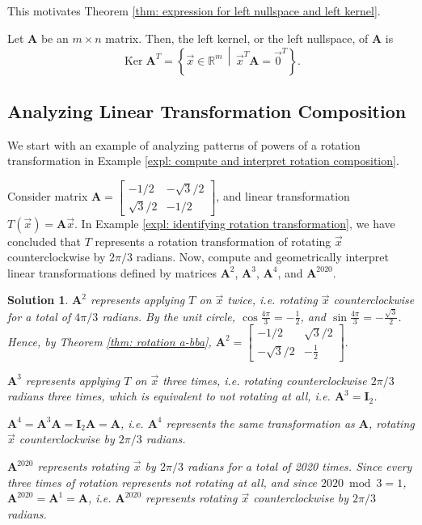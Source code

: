 \documentclass[]{book}
\DeclareMathOperator{\kernel}{Ker}
\newcommand{\suchthat}{\,\middle|\,}
\newcommand{\mat}[1]{\ensuremath{\mathbf{#1}}}
\newcommand{\idmat}[1][n]{\ensuremath{\mat{I}_#1}}
\newcommand{\R}{\ensuremath{\mathbb{R}}}
\newtheorem*{solution}{Solution}
\begin{document}
This motivates Theorem \ref{thm: expression for left nullspace and left kernel}.

\begin{theorem}
    \label{thm: expression for left nullspace and left kernel}
    Let $\mat{A}$ be an $m \times n$ matrix. Then, the left kernel, or the left nullspace, of $\mat{A}$ is
    \[\kernel\mat{A}^T = \left\{\vec{x} \in \R^m \suchthat \vec{x}^T\mat{A} = \vec{0}^T\right\}.\]
\end{theorem}

\subsection{Analyzing Linear Transformation Composition}
We start with an example of analyzing patterns of powers of a rotation transformation in Example \ref{expl: compute and interpret rotation composition}.
\begin{example}
\label{expl: compute and interpret rotation composition}
    Consider matrix $\mat{A} = \begin{bmatrix}-1/2 & -\sqrt{3}/2 \\ \sqrt{3}/2 & -1/2 \end{bmatrix}$, and linear transformation $T(\vec{x}) = \mat{A}\vec{x}$. In Example \ref{expl: identifying rotation transformation}, we have concluded that $T$ represents a rotation transformation of rotating $\vec{x}$ counterclockwise by $2\pi / 3$ radians. Now, compute and geometrically interpret linear transformations defined by matrices $\mat{A}^2$, $\mat{A}^3$, $\mat{A}^4$, and $\mat{A}^{2020}$.
\begin{solution}
    $\mat{A}^2$ represents applying $T$ on $\vec{x}$ twice, i.e. rotating $\vec{x}$ counterclockwise for a total of $4\pi / 3$ radians. By the unit circle, $\cos\frac{4\pi}{3} = -\frac{1}{2}$, and $\sin\frac{4\pi}{3} = -\frac{\sqrt{3}}{2}$. Hence, by Theorem \ref{thm: rotation a-bba}, $\mat{A}^2 = \begin{bmatrix}-1/2 & \sqrt{3}/2 \\ -\sqrt{3}/2 & -\frac{1}{2}\end{bmatrix}.$
    
    $\mat{A}^3$ represents applying $T$ on $\vec{x}$ three times, i.e. rotating counterclockwise $2\pi / 3$ radians three times, which is equivalent to not rotating at all, i.e. $\mat{A}^3 = \idmat[2]$. 
    
    $\mat{A}^4 = \mat{A}^3\mat{A} = \idmat[2]\mat{A} = \mat{A}$, i.e. $\mat{A}^4$ represents the same transformation as $\mat{A}$, rotating $\vec{x}$ counterclockwise by $2\pi / 3$ radians.
    
    $\mat{A}^{2020}$ represents rotating $\vec{x}$ by $2\pi / 3$ radians for a total of 2020 times. Since every three times of rotation represents not rotating at all, and since $2020 \bmod 3 = 1$, $\mat{A}^{2020} = \mat{A}^1 = \mat{A}$, i.e. $\mat{A}^{2020}$ represents rotating $\vec{x}$ counterclockwise by $2\pi / 3$ radians. \hfill \qedsymbol
\end{solution}
\end{example}
\end{document}

